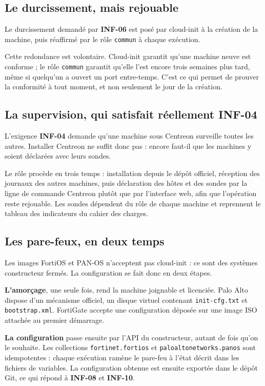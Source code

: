 \documentclass[11pt,a4paper]{article}
\newcommand{\ttb}[1]{\texttt{\small #1}}
\newcommand{\rid}[1]{\textcolor{primary}{\textbf{\small #1}}}
\begin{document}
\subsection{Le durcissement, mais rejouable}

Le durcissement demandé par \rid{INF-06} est posé par cloud-init à la création
de la machine, puis réaffirmé par le rôle \ttb{commun} à chaque exécution.

Cette redondance est volontaire. Cloud-init garantit qu'une machine neuve est
conforme ; le rôle \ttb{commun} garantit qu'elle l'est encore trois semaines
plus tard, même si quelqu'un a ouvert un port entre-temps. C'est ce qui permet
de prouver la conformité à tout moment, et non seulement le jour de la création.

\subsection{La supervision, qui satisfait réellement INF-04}

L'exigence \rid{INF-04} demande qu'une machine sous Centreon surveille toutes
les autres. Installer Centreon ne suffit donc pas : encore faut-il que les
machines y soient déclarées avec leurs sondes.

Le rôle procède en trois temps : installation depuis le dépôt officiel,
réception des journaux des autres machines, puis déclaration des hôtes et des
sondes par la ligne de commande Centreon plutôt que par l'interface web, afin
que l'opération reste rejouable. Les sondes dépendent du rôle de chaque machine
et reprennent le tableau des indicateurs du cahier des charges.

\subsection{Les pare-feux, en deux temps}

Les images FortiOS et PAN-OS n'acceptent pas cloud-init : ce sont des systèmes
constructeur fermés. La configuration se fait donc en deux étapes.

\textbf{L'amorçage}, une seule fois, rend la machine joignable et licenciée.
Palo Alto dispose d'un mécanisme officiel, un disque virtuel contenant
\ttb{init-cfg.txt} et \ttb{bootstrap.xml}. FortiGate accepte une configuration
déposée sur une image ISO attachée au premier démarrage.

\textbf{La configuration} passe ensuite par l'API du constructeur, autant de
fois qu'on le souhaite. Les collections \ttb{fortinet.fortios} et
\ttb{paloaltonetworks.panos} sont idempotentes : chaque exécution ramène le
pare-feu à l'état décrit dans les fichiers de variables. La configuration
obtenue est ensuite exportée dans le dépôt Git, ce qui répond à \rid{INF-08} et
\rid{INF-10}.
\end{document}
